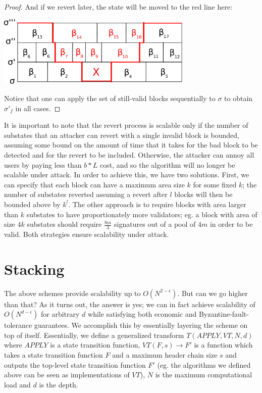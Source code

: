 \documentclass[11pt,a4paper]{report}
\theoremstyle{plain}
\theoremstyle{definition}
\theoremstyle{remark}
\begin{document}
\begin{proof}
And if we revert later, the state will be moved to the red line here:

\begin{center}
\includegraphics[width=0.7\textwidth]{figs/pdfs/revert3.pdf}
\end{center}

Notice that one can apply the set of still-valid blocks sequentially to $\sigma$ to obtain $\sigma'_f$ in all cases.
\end{proof}

It is important to note that the revert process is scalable only if the number of substates that an attacker can revert with a single invalid block is bounded, assuming some bound on the amount of time that it takes for the bad block to be detected and for the revert to be included. Otherwise, the attacker can annoy all users by paying less than $b * L$ cost, and so the algorithm will no longer be scalable under attack. In order to achieve this, we have two solutions. First, we can specify that each block can have a maximum area size $k$ for some fixed $k$; the number of substates reverted assuming a revert after $l$ blocks will then be bounded above by $k^l$. The other approach is to require blocks with area larger than $k$ substates to have proportionately more validators; eg. a block with area of size $4k$ substates should require $\frac{8m}{3}$ signatures out of a pool of $4m$ in order to be valid. Both strategies ensure scalability under attack.

\chapter{Stacking}

The above schemes provide scalability up to $O(N^{2-\epsilon})$. But can we go higher than that? As it turns out, the answer is yes; we can in fact achieve scalability of $O(N^{d-\epsilon})$ for arbitrary $d$ while satisfying both economic and Byzantine-fault-tolerance guarantees. We accomplish this by essentially layering the scheme on top of itself. Essentially, we define a generalized transform $T(APPLY, VT, N, d)$ where $APPLY$ is a state transition function, $VT(F, s) \rightarrow F'$ is a function which takes a state transition function $F$ and a maximum header chain size $s$ and outputs the top-level state transition function $F'$ (eg. the algorithms we defined above can be seen as implementations of $VT$), $N$ is the maximum computational load and $d$ is the depth.
\end{document}
